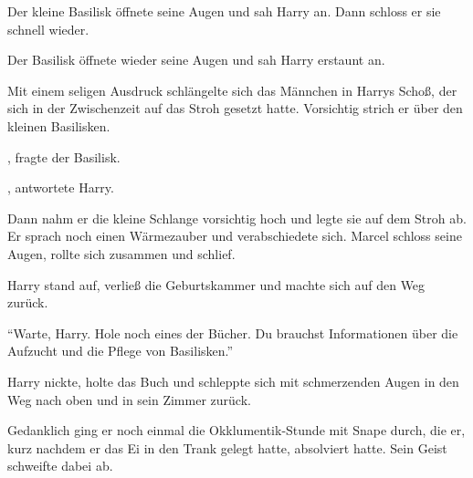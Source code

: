 
Der kleine Basilisk öffnete seine Augen und sah Harry an. Dann schloss er sie schnell wieder. 

 Der Basilisk öffnete wieder seine Augen und sah Harry erstaunt an. 

Mit einem seligen Ausdruck schlängelte sich das Männchen in Harrys Schoß, der sich in der Zwischenzeit auf das Stroh gesetzt hatte. Vorsichtig strich er über den kleinen Basilisken.

, fragte der Basilisk.

, antwortete Harry.




 Dann nahm er die kleine Schlange vorsichtig hoch und legte sie auf dem Stroh ab. Er sprach noch einen Wärmezauber und verabschiedete sich. Marcel schloss seine Augen, rollte sich zusammen und schlief.

Harry stand auf, verließ die Geburtskammer und machte sich auf den Weg zurück.

\enquote{Warte, Harry. Hole noch eines der Bücher. Du brauchst Informationen über die Aufzucht und die Pflege von Basilisken.}

Harry nickte, holte das Buch und schleppte sich mit schmerzenden Augen in den Weg nach oben und in sein Zimmer zurück.

\trenn

Gedanklich ging er noch einmal die Okklumentik-Stunde mit Snape durch, die er, kurz nachdem er das Ei in den Trank gelegt hatte, absolviert hatte. Sein Geist schweifte dabei ab.

